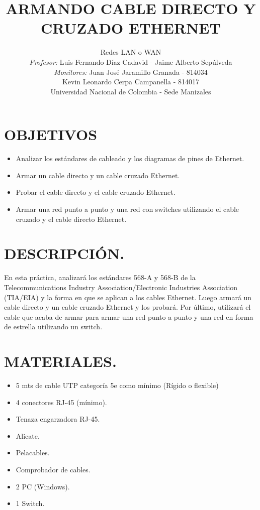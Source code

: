 \documentclass[journal]{IEEEtran}
\title{\textbf{ARMANDO CABLE DIRECTO Y CRUZADO ETHERNET}}
\author{Redes LAN o WAN \\
	\textit{Profesor:} Luis Fernando Díaz Cadavid -  Jaime Alberto Sepúlveda\\ 
	\textit{Monitores:} Juan José Jaramillo Granada - 814034 \\
	Kevin Leonardo Cerpa Campanella - 814017 \\
	Universidad Nacional de Colombia - Sede Manizales}
\date{}
\begin{document}
\maketitle

\section{OBJETIVOS}
\begin{itemize}
\item Analizar los estándares de cableado y los diagramas de pines de Ethernet.
\item Armar un cable directo y un cable cruzado Ethernet.
\item Probar el cable directo y el cable cruzado Ethernet.
 \item Armar una red punto a punto y una red con switches utilizando el cable cruzado y el cable directo Ethernet.
\end{itemize}

\section{DESCRIPCIÓN.}
En esta práctica, analizará los estándares 568-A y 568-B de la Telecommunications Industry Association/Electronic Industries Association (TIA/EIA) y la forma en que se aplican a los cables Ethernet. Luego armará un cable directo y un cable cruzado Ethernet y los probará. Por último, utilizará el cable que acaba de armar para armar una red punto a punto y una red en forma de estrella utilizando un switch.
\section{MATERIALES.}
\begin{itemize}
\item 5 mts de cable UTP categoría 5e como mínimo (Rígido o flexible)
 \item 4 conectores RJ-45 (mínimo).
 \item Tenaza engarzadora RJ-45.
 \item Alicate.
 \item Pelacables.
 \item Comprobador de cables.
 \item 2 PC (Windows).
 \item 1 Switch.
\end{itemize}
\end{document}
